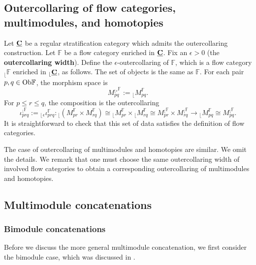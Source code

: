\documentclass[reqno, 10pt]{amsart}
\numberwithin{equation}{section}
\numberwithin{equation}{section}
\theoremstyle{definition}
\theoremstyle{remark}
\newcommand{\beqn}{\begin{equation*}}
\newcommand{\eeqn}{\end{equation*}}
\newcommand{\mb}{\mathbb}
\renewcommand{\outer}{{}_{\lfloor}}
\newcommand{\uds}[1]{\underline{\smash{#1}}}
\begin{document}
\subsection{Outercollaring of flow categories, multimodules, and homotopies}

Let $\uds{\bf C}$ be a regular stratification category which admits the outercollaring construction. Let ${\mb F}$ be a flow category enriched in $\uds{\bf C}$. Fix an $\epsilon>0$ (the {\bf outercollaring width}). Define the $\epsilon$-outercollaring of ${\mb F}$, which is a flow category $\outer   {\mb F}$ enriched in $\outer \uds {\bf C}$, as follows. The set of objects is the same as ${\mb F}$. For each pair $p, q \in {\rm Ob}{\mb F}$, the morphism space is
\beqn
M_{pq}^{\outer {}_\epsilon {\mb F}}:= \outer  M_{pq}^{\mb F}.
\eeqn
For $p\leq r \leq q$, the composition is the outercollaring
\beqn
\iota_{prq}^{\outer   {\mb F}}:= \outer {}_\epsilon \iota_{prq}^{\mb F}: \outer   ( M_{pr}^{\mb F} \times M_{rq}^{\mb F}) \cong \outer   M_{pr}^{\mb F} \times \outer  M_{rq}^{\mb F} \cong M_{pr}^{\outer   {\mb F}} \times M_{rq}^{\outer  {\mb F}} \to \outer  M_{pq}^{{\mb F}} \cong M_{pq}^{\outer   {\mb F}}.
\eeqn
It is straightforward to check that this set of data satisfies the definition of flow categories. 

The case of outercollaring of multimodules and homotopies are similar. We omit the details. We remark that one must choose the same outercollaring width of involved flow categories to obtain a corresponding outercollaring of multimodules and homotopies.

\subsection{Multimodule concatenations}\label{subsection_concatenation}


\subsubsection{Bimodule concatenations}

Before we discuss the more general multimodule concatenation, we first consider the bimodule case, which was discussed in \cite[Section 5]{Abouzaid_Blumberg_2024}. 
\end{document}
